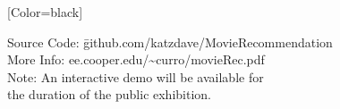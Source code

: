 \documentclass{article}
\begin{document}
\hfill
\begin{minipage}{10in}
{
	[Color=black]
	\fontsize{0.6in}{8em}\selectfont
	\begin{tabbing}
	Source Code: \= github.com/katzdave/MovieRecommendation\\
	More Info: \> ee.cooper.edu/\textasciitilde{}curro/movieRec.pdf\\
	Note: \> An interactive demo will be available for \\ \> the duration of the public exhibition.
	\end{tabbing}
}
\end{minipage} 
\end{document}
